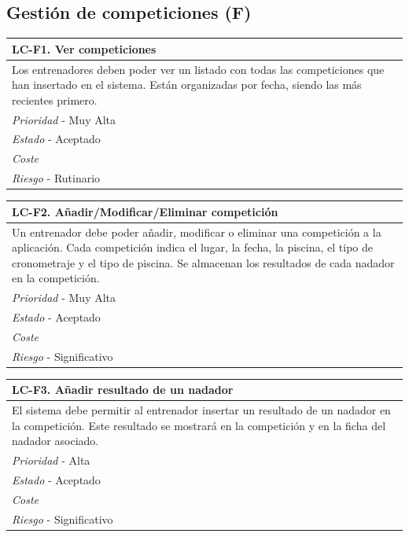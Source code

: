 %
%
\subsection{Gestión de competiciones (F)} %
	\label{sub:gestion_de_competiciones}

	\begin{center}
		\begin{tabularx}{15cm}{|X|}
			\hline 
				\bf{LC-F1. Ver competiciones}\\
			\hline
				Los entrenadores deben poder ver un listado con todas las competiciones que han insertado en el sistema. Están organizadas por fecha, siendo las más recientes primero.\\
			\hline
				{\it Prioridad} - Muy Alta\\
			\hline
				{\it Estado} - Aceptado\\
			\hline
				{\it Coste}\\
			\hline
				{\it Riesgo} - Rutinario\\
			\hline
		\end{tabularx}
	\end{center}
	
	\begin{center}
		\begin{tabularx}{15cm}{|X|}
			\hline 
				\bf{LC-F2. Añadir/Modificar/Eliminar competición }\\
			\hline
				Un entrenador debe poder añadir, modificar o eliminar una competición a la aplicación. Cada competición indica el lugar, la fecha, la piscina, el tipo de cronometraje y el tipo de piscina. Se almacenan los resultados de cada nadador en la competición.\\
			\hline
				{\it Prioridad} - Muy Alta\\
			\hline
				{\it Estado} - Aceptado\\
			\hline
				{\it Coste}\\
			\hline
				{\it Riesgo} - Significativo\\
			\hline
		\end{tabularx}
	\end{center}
	
	\begin{center}
		\begin{tabularx}{15cm}{|X|}
			\hline 
				\bf{LC-F3. Añadir resultado de un nadador }\\
			\hline
				El sistema debe permitir al entrenador insertar un resultado de un nadador en la competición. Este resultado se mostrará en la competición y en la ficha del nadador asociado.\\
			\hline
				{\it Prioridad} - Alta\\
			\hline
				{\it Estado} - Aceptado\\
			\hline
				{\it Coste}\\
			\hline
				{\it Riesgo} - Significativo\\
			\hline
		\end{tabularx}
	\end{center}
	
